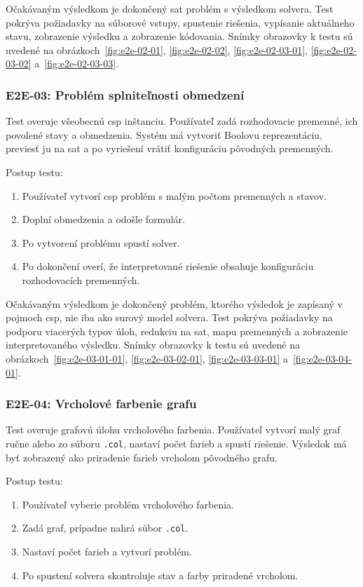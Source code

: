 Očakávaným výsledkom je dokončený \acrshort{sat} problém s výsledkom solvera. Test pokrýva požiadavky na súborové vstupy, spustenie riešenia, vypísanie aktuálneho stavu, zobrazenie výsledku a zobrazenie kódovania. Snímky obrazovky k testu sú uvedené na obrázkoch~\ref{fig:e2e-02-01}, \ref{fig:e2e-02-02}, \ref{fig:e2e-02-03-01}, \ref{fig:e2e-02-03-02} a~\ref{fig:e2e-02-03-03}.

\subsubsection{E2E-03: Problém splniteľnosti obmedzení}\label{sec:testing:e2e-03}
Test overuje všeobecnú \acrshort{csp} inštanciu. Používateľ zadá rozhodovacie premenné, ich povolené stavy a obmedzenia. Systém má vytvoriť Boolovu reprezentáciu, previesť ju na \acrshort{sat} a po vyriešení vrátiť konfiguráciu pôvodných premenných.

Postup testu:
\begin{enumerate}
    \item Používateľ vytvorí \acrshort{csp} problém s malým počtom premenných a stavov.
    \item Doplní obmedzenia a odošle formulár.
    \item Po vytvorení problému spustí solver.
    \item Po dokončení overí, že interpretované riešenie obsahuje konfiguráciu rozhodovacích premenných.
\end{enumerate}

Očakávaným výsledkom je dokončený problém, ktorého výsledok je zapísaný v pojmoch \acrshort{csp}, nie iba ako surový model solvera. Test pokrýva požiadavky na podporu viacerých typov úloh, redukciu na \acrshort{sat}, mapu premenných a zobrazenie interpretovaného výsledku. Snímky obrazovky k testu sú uvedené na obrázkoch~\ref{fig:e2e-03-01-01}, \ref{fig:e2e-03-02-01}, \ref{fig:e2e-03-03-01} a~\ref{fig:e2e-03-04-01}.

\subsubsection{E2E-04: Vrcholové farbenie grafu}\label{sec:testing:e2e-04}
Test overuje grafovú úlohu vrcholového farbenia. Používateľ vytvorí malý graf ručne alebo zo súboru \texttt{.col}, nastaví počet farieb a spustí riešenie. Výsledok má byť zobrazený ako priradenie farieb vrcholom pôvodného grafu.

Postup testu:
\begin{enumerate}
    \item Používateľ vyberie problém vrcholového farbenia.
    \item Zadá graf, prípadne nahrá súbor \texttt{.col}.
    \item Nastaví počet farieb a vytvorí problém.
    \item Po spustení solvera skontroluje stav a farby priradené vrcholom.
\end{enumerate}

